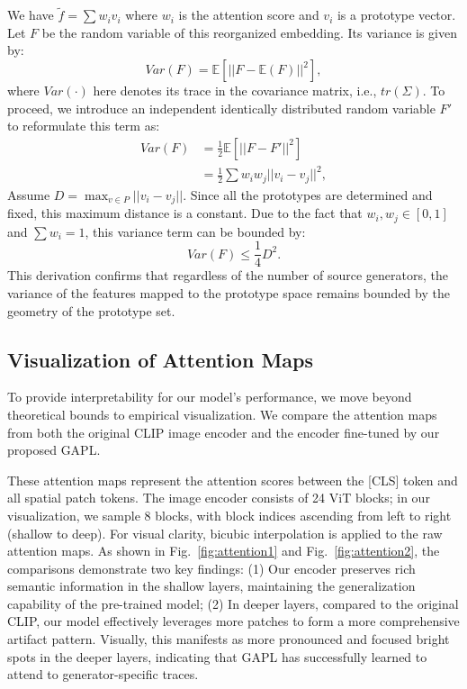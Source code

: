 We have $ \tilde{f}=\sum w_i v_i$ where $w_i$ is the attention score and $v_i$ is a prototype vector. Let $F$ be the random variable of this reorganized embedding. Its variance is given by:
\begin{equation}
    Var(F)=\mathbb{E} \left[ || F-\mathbb{E}(F)||^2\right],
\end{equation}
where $Var(\cdot)$ here denotes its trace in the covariance matrix, i.e., $tr(\Sigma)$. To proceed, we introduce an independent identically distributed random variable $F'$ to reformulate this term as:
\begin{equation}
    \begin{aligned}
        Var(F)& =\frac{1}{2}\mathbb{E} \left[ ||F - F'||^2 \right] \\
        & = \frac{1}{2} \sum w_i w_j|| v_i-v_j||^2,
    \end{aligned}
\end{equation}
Assume $ D= \max_{v \in P}||v_i-v_j||$. Since all the prototypes are determined and fixed, this maximum distance is a constant. Due to the fact that $w_i, w_j \in [0,1]$ and $\sum w_i = 1$, this variance term can be bounded by:
\begin{equation}
    Var(F) \le \frac{1}{4}D^2.
\end{equation}
This derivation confirms that regardless of the number of source generators, the variance of the features mapped to the prototype space remains bounded by the geometry of the prototype set.

\subsection{Visualization of Attention Maps}
\label{sec:vis_attention}

To provide interpretability for our model's performance, we move beyond theoretical bounds to empirical visualization. We compare the attention maps from both the original CLIP image encoder and the encoder fine-tuned by our proposed GAPL. 

These attention maps represent the attention scores between the [CLS] token and all spatial patch tokens. The image encoder consists of 24 ViT blocks; in our visualization, we sample 8 blocks, with block indices ascending from left to right (shallow to deep). For visual clarity, bicubic interpolation is applied to the raw attention maps. As shown in Fig.~\ref{fig:attention1} and Fig.~\ref{fig:attention2}, the comparisons demonstrate two key findings: (1) Our encoder preserves rich semantic information in the shallow layers, maintaining the generalization capability of the pre-trained model; (2) In deeper layers, compared to the original CLIP, our model effectively leverages more patches to form a more comprehensive artifact pattern. Visually, this manifests as more pronounced and focused bright spots in the deeper layers, indicating that GAPL has successfully learned to attend to generator-specific traces.



